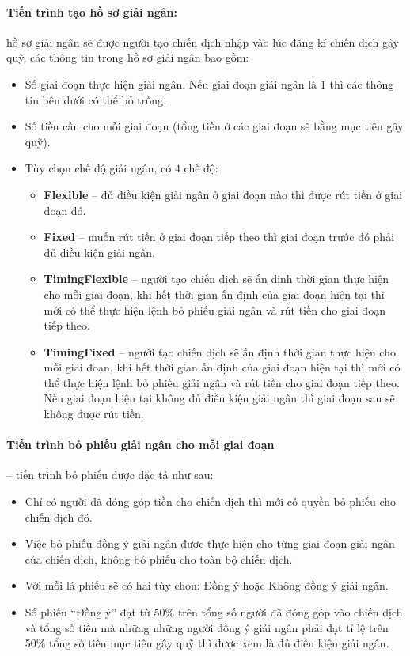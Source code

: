 \documentclass[../main-report.tex]{subfiles}
\begin{document}
\paragraph{Tiến trình tạo hồ sơ giải ngân:} hồ sơ giải ngân sẽ được người tạo chiến dịch nhập vào lúc đăng kí chiến dịch gây quỹ, các thông tin trong hồ sơ giải ngân bao gồm:

\begin{itemize}
\item Số giai đoạn thực hiện giải ngân. Nếu giai đoạn giải ngân là $ 1 $ thì các thông tin bên dưới có thể bỏ trống.
\item Số tiền cần cho mỗi giai đoạn (tổng tiền ở các giai đoạn sẽ bằng mục tiêu gây quỹ).
\item Tùy chọn chế độ giải ngân, có $ 4 $ chế độ:
\begin{itemize}
\item \textbf{Flexible} -- đủ điều kiện giải ngân ở giai đoạn nào thì được rút tiền ở giai đoạn đó.
\item \textbf{Fixed} -- muốn rút tiền ở giai đoạn tiếp theo thì giai đoạn trước đó phải đủ điều kiện giải ngân.
\item \textbf{TimingFlexible} -- người tạo chiến dịch sẽ ấn định thời gian thực hiện cho mỗi giai đoạn, khi hết thời gian ấn định của giai đoạn hiện tại thì mới có thể thực hiện lệnh bỏ phiếu giải ngân và rút tiền cho giai đoạn tiếp theo. 
\item \textbf{TimingFixed} -- người tạo chiến dịch sẽ ấn định thời gian thực hiện cho mỗi giai đoạn, khi hết thời gian ấn định của giai đoạn hiện tại thì mới có thể thực hiện lệnh bỏ phiếu giải ngân và rút tiền cho giai đoạn tiếp theo. Nếu giai đoạn hiện tại không đủ điều kiện giải ngân thì giai đoạn sau sẽ không được rút tiền.
\end{itemize}
\end{itemize}

\paragraph{Tiền trình bỏ phiếu giải ngân cho mỗi giai đoạn} -- tiến trình bỏ phiếu được đặc tả như sau:

\begin{itemize}
\item Chỉ có người đã đóng góp tiền cho chiến dịch thì mới có quyền bỏ phiếu cho chiến dịch đó.
\item Việc bỏ phiếu đồng ý giải ngân được thực hiện cho từng giai đoạn giải ngân của chiến dịch, không bỏ phiếu cho toàn bộ chiến dịch.
\item Với mỗi lá phiếu sẽ có hai tùy chọn: Đồng ý hoặc Không đồng ý giải ngân.
\item Số phiếu ``Đồng ý'' đạt từ 50\% trên tổng số người đã đóng góp vào chiến dịch và tổng số tiền mà những những người đồng ý giải ngân phải đạt tỉ lệ trên 50\% tổng số tiền mục tiêu gây quỹ thì được xem là đủ điều kiện giải ngân.
\end{itemize}
\end{document}
